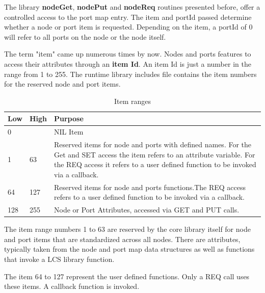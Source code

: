 The library \textbf{nodeGet}, \textbf{nodePut} and \textbf{nodeReq} routines presented before, offer a controlled access to the port map entry. The item and portId passed determine whether a node or port item is requested. Depending on the item, a portId of 0 will refer to all ports on the node or the node itself.


The term "item" came up numerous times by now. Nodes and ports features to access their attributes through an \textbf{item Id}. An item Id is just a number in the range from 1 to 255. The runtime library includes file contains the item numbers for the reserved node and port items.

\begin{table}[!ht]
    \begin{center}
        
        \begin{tabularx}{0.9\textwidth}{|l|l|X|}
            \hline
            \textbf{Low} & \textbf{High} & \textbf{Purpose} \\
            \hline
            0 & & NIL Item \\
            \hline
            1 & 63 & Reserved items for node and ports with defined names. For the Get and SET access the item refers to an attribute variable. For the REQ access it refers to a user defined function to be invoked via a callback. \\
            \hline
            64 & 127 & Reserved items for node and ports functions.The REQ access refers to a user defined function to be invoked via a callback. \\
            \hline
            128 & 255 & Node or Port Attributes, accessed via GET and PUT calls. \\
            \hline
        \end{tabularx}
    \end{center}
    \caption{Item ranges}
\end{table}
\FloatBarrier

The item range numbers  1 to 63 are reserved by the core library itself for node and port items that are standardized across all nodes. There are attributes, typically taken from the node and port map data structures as well as functions that invoke a LCS library function.

The item 64 to 127 represent the user defined functions. Only a REQ call uses these items. A callback function is invoked.

